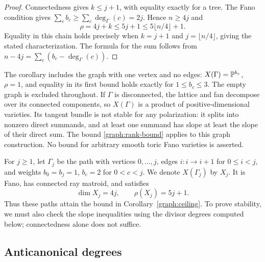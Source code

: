 \begin{proof}
Connectedness gives $k\le j+1$, with equality exactly for a tree.
The Fano condition gives $\sum_c b_c\ge\sum_c\deg_\Gamma(c)=2j$.
Hence $n\ge4j$ and
\[
 \rho=4j+k\le5j+1\le5\lfloor n/4\rfloor+1.
\]
Equality in this chain holds precisely when $k=j+1$ and
$j=\lfloor n/4\rfloor$, giving the stated characterization.
The formula for the sum follows from
$n-4j=\sum_c(b_c-\deg_\Gamma(c))$.
\end{proof}

The corollary includes the graph with one vertex and no edges:
$X(\Gamma)=\mathbb{P}^{b_c}$, $\rho=1$, and equality in its first bound holds
exactly for $1\le b_c\le3$.  The empty graph is excluded throughout.
If $\Gamma$ is disconnected, the lattice and fan decompose over its
connected components, so $X(\Gamma)$ is a product of positive-dimensional
varieties.  Its tangent bundle is not stable for any polarization:
it splits into nonzero direct summands, and at least one summand has
slope at least the slope of their direct sum.  The bound
\eqref{graph:rank-bound} applies to this graph construction. No bound
for arbitrary smooth toric Fano varieties is asserted.

\begin{example}\label{graph:path}
For $j\ge1$, let $\Gamma_j$ be the path with vertices $0,\ldots,j$,
edges $i:i\to i+1$ for $0\le i<j$, and weights
$b_0=b_j=1$, $b_c=2$ for $0<c<j$.
We denote $X(\Gamma_j)$ by $X_j$.
It is Fano, has connected ray matroid, and satisfies
\[
 \dim X_j=4j,\qquad \rho(X_j)=5j+1.
\]
Thus these paths attain the bound in Corollary~\ref{graph:ceiling}.
To prove stability, we must also check the slope inequalities using
the divisor degrees computed below; connectedness alone does not suffice.
\end{example}

\subsection{Anticanonical degrees}

